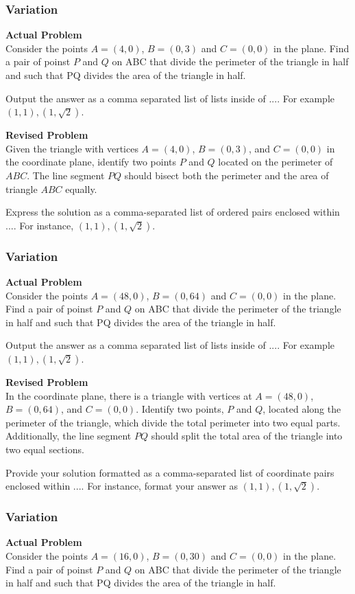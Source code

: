 \subsubsection{Variation}
\textbf{Actual Problem}\\
Consider the points $A = (4, 0)$, $B = (0, 3)$ and $C=(0,0)$ in the plane. Find a pair of poinst $P$ and $Q$ on ABC that divide the perimeter of the triangle in half and such that PQ divides the area of the triangle in half.

Output the answer as a comma separated list of lists inside of $\boxed{...}$. For example $\boxed{(1,1), (1,\sqrt{2})}$.

\textbf{Revised Problem}\\
Given the triangle with vertices $A = (4, 0)$, $B = (0, 3)$, and $C = (0, 0)$ in the coordinate plane, identify two points $P$ and $Q$ located on the perimeter of $ABC$. The line segment $PQ$ should bisect both the perimeter and the area of triangle $ABC$ equally.

Express the solution as a comma-separated list of ordered pairs enclosed within $\boxed{...}$. For instance, $\boxed{(1,1), (1,\sqrt{2})}$.

\subsubsection{Variation}
\textbf{Actual Problem}\\
Consider the points $A = (48, 0)$, $B = (0, 64)$ and $C=(0,0)$ in the plane. Find a pair of poinst $P$ and $Q$ on ABC that divide the perimeter of the triangle in half and such that PQ divides the area of the triangle in half.

Output the answer as a comma separated list of lists inside of $\boxed{...}$. For example $\boxed{(1,1), (1,\sqrt{2})}$.

\textbf{Revised Problem}\\
In the coordinate plane, there is a triangle with vertices at $A = (48, 0)$, $B = (0, 64)$, and $C = (0, 0)$. Identify two points, $P$ and $Q$, located along the perimeter of the triangle, which divide the total perimeter into two equal parts. Additionally, the line segment $PQ$ should split the total area of the triangle into two equal sections.

Provide your solution formatted as a comma-separated list of coordinate pairs enclosed within $\boxed{...}$. For instance, format your answer as $\boxed{(1,1), (1,\sqrt{2})}$.

\subsubsection{Variation}
\textbf{Actual Problem}\\
Consider the points $A = (16, 0)$, $B = (0, 30)$ and $C=(0,0)$ in the plane. Find a pair of poinst $P$ and $Q$ on ABC that divide the perimeter of the triangle in half and such that PQ divides the area of the triangle in half.

